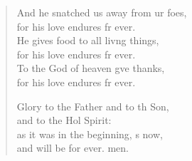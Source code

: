 \begin{verse}
\begin{patverse}
And he snatched us away from ur foes,\Med\\
    for his love endures fr ever.\\
He gives food to all liv\pointup{\i}ng things,\Med\\
    for his love endures fr ever.\\
To the God of heaven g\pointup{\i}ve thanks,\Med\\
    for his love endures fr ever.

Glory to the Father and to th Son,\Med\\
    and to the Hol Spirit:\\
as it was in the beginning, \pointup{\i}s now,\Med\\
    and will be for ever. men.
  \end{patverse}
\end{verse}
